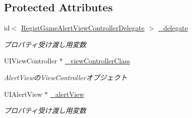 \subsection*{Protected Attributes}
\begin{DoxyCompactItemize}
\item 
\hypertarget{interface_regist_game_alert_view_controller_a6f335ee6c294ddb8a13afc85b253e60f}{
id$<$ \hyperlink{protocol_regist_game_alert_view_controller_delegate-p}{RegistGameAlertViewControllerDelegate} $>$ \hyperlink{interface_regist_game_alert_view_controller_a6f335ee6c294ddb8a13afc85b253e60f}{\_\-delegate}}
\label{interface_regist_game_alert_view_controller_a6f335ee6c294ddb8a13afc85b253e60f}

\begin{DoxyCompactList}\small\item\em プロパティ受け渡し用変数 \end{DoxyCompactList}\item 
\hypertarget{interface_regist_game_alert_view_controller_aad03dba2364eefbf43bcac22554cd1f7}{
UIViewController $\ast$ \hyperlink{interface_regist_game_alert_view_controller_aad03dba2364eefbf43bcac22554cd1f7}{\_\-viewControllerClass}}
\label{interface_regist_game_alert_view_controller_aad03dba2364eefbf43bcac22554cd1f7}

\begin{DoxyCompactList}\small\item\em AlertViewのViewControllerオブジェクト \end{DoxyCompactList}\item 
\hypertarget{interface_regist_game_alert_view_controller_a7fef39e404c1d5d51d24606f4cd81b8b}{
UIAlertView $\ast$ \hyperlink{interface_regist_game_alert_view_controller_a7fef39e404c1d5d51d24606f4cd81b8b}{\_\-alertView}}
\label{interface_regist_game_alert_view_controller_a7fef39e404c1d5d51d24606f4cd81b8b}

\begin{DoxyCompactList}\small\item\em プロパティ受け渡し用変数 \end{DoxyCompactList}\end{DoxyCompactItemize}
